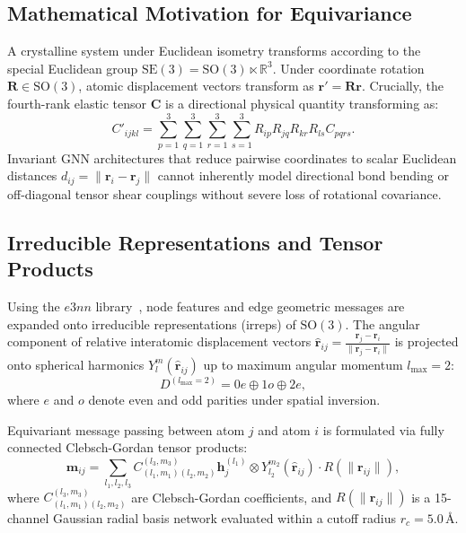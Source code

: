 \documentclass[twocolumn,10pt,aps,prb,superscriptaddress,floatfix]{revtex4-2}
\begin{document}
\subsection{Mathematical Motivation for Equivariance}
A crystalline system under Euclidean isometry transforms according to the special Euclidean group $\mathrm{SE}(3) = \mathrm{SO}(3) \ltimes \mathbb{R}^3$. Under coordinate rotation $\bm{R} \in \mathrm{SO}(3)$, atomic displacement vectors transform as $\bm{r}' = \bm{R} \bm{r}$. Crucially, the fourth-rank elastic tensor $\bm{C}$ is a directional physical quantity transforming as:
\begin{equation}
C'_{ijkl} = \sum_{p=1}^3 \sum_{q=1}^3 \sum_{r=1}^3 \sum_{s=1}^3 R_{ip} R_{jq} R_{kr} R_{ls} C_{pqrs}.
\label{eq:tensor_transform}
\end{equation}
Invariant GNN architectures that reduce pairwise coordinates to scalar Euclidean distances $d_{ij} = \|\bm{r}_i - \bm{r}_j\|$ cannot inherently model directional bond bending or off-diagonal tensor shear couplings without severe loss of rotational covariance.

\subsection{Irreducible Representations and Tensor Products}
Using the $e3nn$ library~\cite{geiger2022e3nn}, node features and edge geometric messages are expanded onto irreducible representations (irreps) of $\mathrm{SO}(3)$. The angular component of relative interatomic displacement vectors $\hat{\bm{r}}_{ij} = \frac{\bm{r}_j - \bm{r}_i}{\|\bm{r}_j - \bm{r}_i\|}$ is projected onto spherical harmonics $Y_l^m(\hat{\bm{r}}_{ij})$ up to maximum angular momentum $l_{\max} = 2$:
\begin{equation}
D^{(l_{\max} = 2)} = 0e \oplus 1o \oplus 2e,
\label{eq:irreps_sh}
\end{equation}
where $e$ and $o$ denote even and odd parities under spatial inversion.

Equivariant message passing between atom $j$ and atom $i$ is formulated via fully connected Clebsch-Gordan tensor products:
\begin{equation}
\bm{m}_{ij} = \sum_{l_1, l_2, l_3} C_{(l_1, m_1)(l_2, m_2)}^{(l_3, m_3)} \bm{h}_j^{(l_1)} \otimes Y_{l_2}^{m_2}(\hat{\bm{r}}_{ij}) \cdot R(\|\bm{r}_{ij}\|),
\label{eq:tensor_product}
\end{equation}
where $C_{(l_1, m_1)(l_2, m_2)}^{(l_3, m_3)}$ are Clebsch-Gordan coefficients, and $R(\|\bm{r}_{ij}\|)$ is a 15-channel Gaussian radial basis network evaluated within a cutoff radius $r_c = 5.0\,\text{\AA}$.
\end{document}
